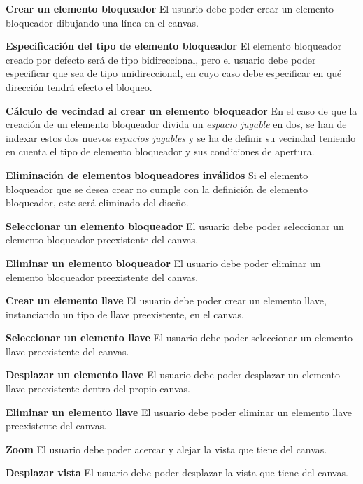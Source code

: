 	\item \textbf{Crear un elemento bloqueador}\newline
		El usuario debe poder crear un elemento bloqueador dibujando una línea en el canvas.
		\begin{functional}
			\item \textbf{Especificación del tipo de elemento bloqueador}\newline
				El elemento bloqueador creado por defecto será de tipo bidireccional, pero el usuario debe poder especificar que sea de tipo unidireccional, en cuyo caso debe especificar en qué dirección tendrá efecto el bloqueo.
			\item \textbf{Cálculo de vecindad al crear un elemento bloqueador}\newline
				En el caso de que la creación de un elemento bloqueador divida un \textit{espacio jugable} en dos, se han de indexar estos dos nuevos \textit{espacios jugables} y se ha de definir su vecindad teniendo en cuenta el tipo de elemento bloqueador y sus condiciones de apertura.
			\item \textbf{Eliminación de elementos bloqueadores inválidos}\newline
				Si el elemento bloqueador que se desea crear no cumple con la definición de elemento bloqueador, este será eliminado del diseño.
		\end{functional}
	\item \textbf{Seleccionar un elemento bloqueador}\newline
		El usuario debe poder seleccionar un elemento bloqueador preexistente del canvas.
	\item \textbf{Eliminar un elemento bloqueador}\newline
		El usuario debe poder eliminar un elemento bloqueador preexistente del canvas.
	\item \textbf{Crear un elemento llave}\newline
		El usuario debe poder crear un elemento llave, instanciando un tipo de llave preexistente, en el canvas.
	\item \textbf{Seleccionar un elemento llave}\newline
		El usuario debe poder seleccionar un elemento llave preexistente del canvas.
	\item \textbf{Desplazar un elemento llave}\newline
		El usuario debe poder desplazar un elemento llave preexistente dentro del propio canvas.
	\item \textbf{Eliminar un elemento llave}\newline
		El usuario debe poder eliminar un elemento llave preexistente del canvas.
	\item \textbf{Zoom}\newline
		El usuario debe poder acercar y alejar la vista que tiene del canvas.
	\item \textbf{Desplazar vista}\newline
		El usuario debe poder desplazar la vista que tiene del canvas.
